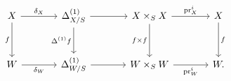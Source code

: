 \[
\begin{tikzcd}[column sep=large,row sep=large]
  X
    \arrow[r,"\delta_X"]
    \arrow[d,"f"']
  &
  \Delta^{(1)}_{X/S}
    \arrow[r]
    \arrow[d,"\Delta^{(1)}f"']
  &
  X\times_S X
    \arrow[r,"\operatorname{pr}_X^i"]
    \arrow[d,"f\times f"']
  &
  X
    \arrow[d,"f"]
  \\
  W
    \arrow[r,"\delta_W"']
  &
  \Delta^{(1)}_{W/S}
    \arrow[r]
  &
  W\times_S W
    \arrow[r,"\operatorname{pr}_W^i"']
  &
  W.
\end{tikzcd}
\]
